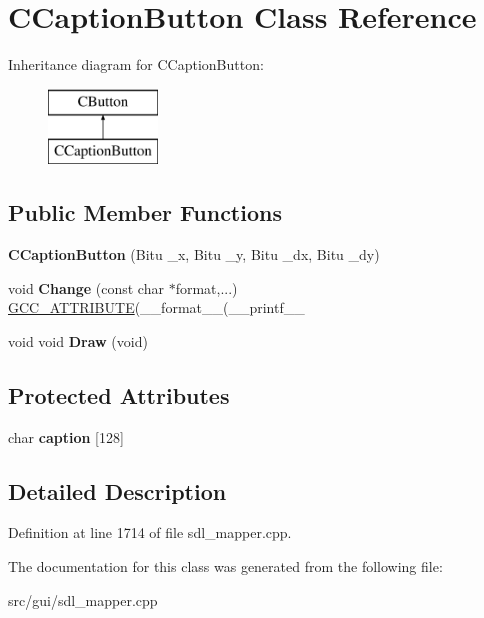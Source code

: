 \hypertarget{classCCaptionButton}{\section{C\-Caption\-Button Class Reference}
\label{classCCaptionButton}
}
Inheritance diagram for C\-Caption\-Button\-:\begin{figure}[H]
\begin{center}
\leavevmode
\includegraphics[height=2.000000cm]{classCCaptionButton}
\end{center}
\end{figure}
\subsection*{Public Member Functions}
\begin{DoxyCompactItemize}
\item 
\hypertarget{classCCaptionButton_ab3693869d536d69e5a5c206f22865583}{{\bfseries C\-Caption\-Button} (Bitu \-\_\-x, Bitu \-\_\-y, Bitu \-\_\-dx, Bitu \-\_\-dy)}\label{classCCaptionButton_ab3693869d536d69e5a5c206f22865583}

\item 
\hypertarget{classCCaptionButton_a497661808a80201830f2241f75750e90}{void {\bfseries Change} (const char $\ast$format,...) \hyperlink{structGCC__ATTRIBUTE}{G\-C\-C\-\_\-\-A\-T\-T\-R\-I\-B\-U\-T\-E}(\-\_\-\-\_\-format\-\_\-\-\_\-(\-\_\-\-\_\-printf\-\_\-\-\_\-}\label{classCCaptionButton_a497661808a80201830f2241f75750e90}

\item 
\hypertarget{classCCaptionButton_a953f5b12ba13b61bc373fc3d25295079}{void void {\bfseries Draw} (void)}\label{classCCaptionButton_a953f5b12ba13b61bc373fc3d25295079}

\end{DoxyCompactItemize}
\subsection*{Protected Attributes}
\begin{DoxyCompactItemize}
\item 
\hypertarget{classCCaptionButton_a6e015cc9759137aa04d7c54bd936233b}{char {\bfseries caption} \mbox{[}128\mbox{]}}\label{classCCaptionButton_a6e015cc9759137aa04d7c54bd936233b}

\end{DoxyCompactItemize}


\subsection{Detailed Description}


Definition at line 1714 of file sdl\-\_\-mapper.\-cpp.



The documentation for this class was generated from the following file\-:\begin{DoxyCompactItemize}
\item 
src/gui/sdl\-\_\-mapper.\-cpp\end{DoxyCompactItemize}
